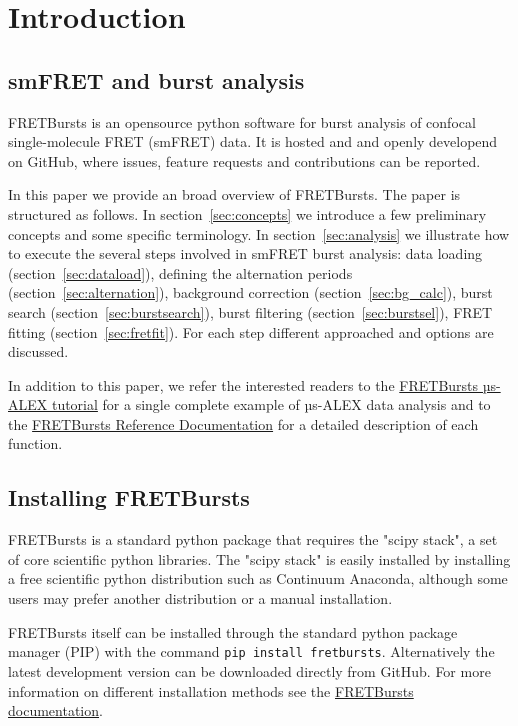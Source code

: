 \section{Introduction}

\subsection{smFRET and burst analysis}

FRETBursts is an opensource python software for burst analysis of confocal 
single-molecule FRET (smFRET) data. 
It is hosted and and openly developend on GitHub, where
issues, feature requests and contributions can be reported.

In this paper we provide an broad overview of FRETBursts. The 
paper is structured as follows. In section~\ref{sec:concepts} we
introduce a few preliminary concepts and some specific terminology.
In section~\ref{sec:analysis} we illustrate how to execute the several steps involved
in smFRET burst analysis: data loading (section~\ref{sec:dataload}), defining the 
alternation periods (section~\ref{sec:alternation}), background 
correction (section~\ref{sec:bg_calc}), burst search (section~\ref{sec:burstsearch}), 
burst filtering (section~\ref{sec:burstsel}), FRET fitting (section~\ref{sec:fretfit}). 
For each step different approached and options are discussed.

In addition to this paper, we refer the interested readers to the 
\href{http://nbviewer.ipython.org/github/tritemio/FRETBursts_notebooks/blob/master/notebooks/FRETBursts\%20-\%20us-ALEX\%20smFRET\%20burst\%20analysis.ipynb}{FRETBursts µs-ALEX tutorial} 
for a single complete example of µs-ALEX data analysis and to the
\href{http://fretbursts.readthedocs.org/}{FRETBursts Reference Documentation}
for a detailed description of each function.

\subsection{Installing FRETBursts}
FRETBursts is a standard python package that requires the "scipy stack", a set
of core scientific python libraries.
The "scipy stack" is easily installed by installing a free scientific python
distribution such as Continuum Anaconda, although some users may prefer another
distribution or a manual installation.

FRETBursts itself can be installed through the standard python package manager (PIP)
with the command \texttt{pip install fretbursts}. 
Alternatively the latest development version can be downloaded directly 
from GitHub. For more information on different installation methods see the
\href{http://fretbursts.readthedocs.org/en/latest/installation.html}{FRETBursts
documentation}.

